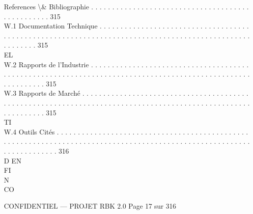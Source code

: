 References \textbackslash{}& Bibliographie . . . . . . . . . . . . . . . . . . . . . . . . . . . . . . . . . . . . . . . . . . . . . . . . . 315\\
W.1     Documentation Technique . . . . . . . . . . . . . . . . . . . . . . . . . . . . . . . . . . . . . . . . . . . . . . . . . . . . . . . . . . . . . . . . . . . . . . . . . . . . . . . . . . . . . . . . . . . . . . . . . . . . . . . 315\\
\vspace{0.5em}
\vspace{0.5em}
\vspace{0.5em}
\vspace{0.5em}
EL\\
W.2     Rapports de l’Industrie . . . . . . . . . . . . . . . . . . . . . . . . . . . . . . . . . . . . . . . . . . . . . . . . . . . . . . . . . . . . . . . . . . . . . . . . . . . . . . . . . . . . . . . . . . . . . . . . . . . . . . . . . . . 315\\
W.3     Rapports de Marché . . . . . . . . . . . . . . . . . . . . . . . . . . . . . . . . . . . . . . . . . . . . . . . . . . . . . . . . . . . . . . . . . . . . . . . . . . . . . . . . . . . . . . . . . . . . . . . . . . . . . . . . . . . . . 315\\
\vspace{0.5em}
\vspace{0.5em}
\vspace{0.5em}
\vspace{0.5em}
TI\\
W.4     Outils Cités . . . . . . . . . . . . . . . . . . . . . . . . . . . . . . . . . . . . . . . . . . . . . . . . . . . . . . . . . . . . . . . . . . . . . . . . . . . . . . . . . . . . . . . . . . . . . . . . . . . . . . . . . . . . . . . . . . . . . . 316\\
\vspace{0.5em}
\vspace{0.5em}
\vspace{0.5em}
\vspace{0.5em}
D            EN\\
FI\\
N\\
CO\\
\vspace{0.5em}
\vspace{0.5em}
\vspace{0.5em}
\vspace{0.5em}
\begin{confidential}CONFIDENTIEL — PROJET RBK 2.0                                                                                Page 17 sur 316\end{confidential}

